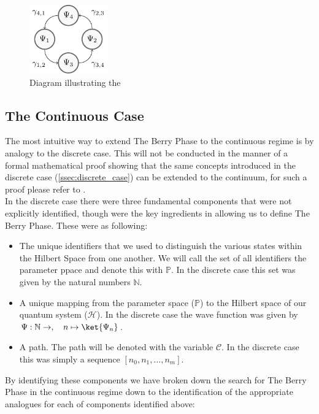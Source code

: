 \documentclass{article}
\begin{document}
\begin{figure}
  \includegraphics[width=0.3\textwidth]{berry_loop}
  \caption{Diagram illustrating the}
  \label{fig:berry_loop}
\end{figure}

\subsection{The Continuous Case \label{ssec:continuous_case}}

The most intuitive way to extend The Berry Phase to the continuous regime is by analogy to the discrete case. This will not be conducted in the manner of a formal mathematical proof showing that the same concepts introduced in the discrete case (\ref{ssec:discrete_case}) can be extended to the continuum, for such a proof please refer to \cite{Asboth2016}.\\

In the discrete case there were three fundamental components that were not explicitly identified, though were the key ingredients in allowing us to define The Berry Phase. These were as following:

\begin{itemize}
  \item The unique identifiers that we used to distinguish the various states within the Hilbert Space from one another. We will call the set of all identifiers the parameter ppace and denote this with $\mathbb{P}$. In the discrete case this set was given by the natural numbers $\mathbb{N}$.
  \item A unique mapping from the parameter space ($\mathbb{P}$) to the Hilbert space of our quantum system ($\mathcal{H}$). In the discrete case the wave function was given by $\Psi: \mathbb{N} \rightarrow, \quad n \mapsto \ket{\Psi_{n}}$. 
  \item A path. The path will be denoted with the variable $\mathcal{C}$. In the discrete case this was simply a sequence $[n_0, n_1, \ldots, n_m]$. 
\end{itemize}

By identifying these components we have broken down the search for The Berry Phase in the continuous regime down to the identification of the appropriate analogues for each of components identified above:
\end{document}
